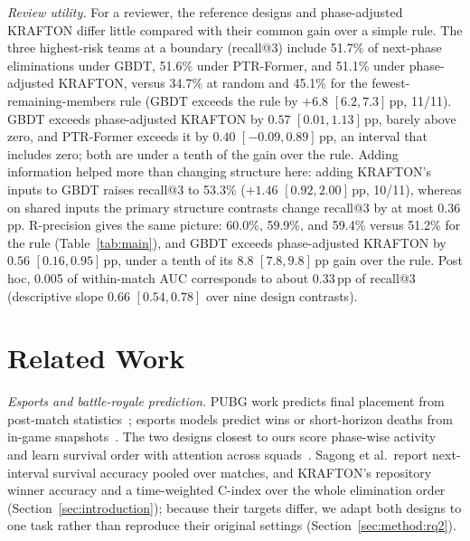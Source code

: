 \documentclass[sigconf,anonymous]{acmart}
\begin{document}
\emph{Review utility.} For a reviewer, the reference designs and phase-adjusted KRAFTON differ little compared with their common gain over a simple rule. The three highest-risk teams at a boundary (recall@3) include 51.7\% of next-phase eliminations under GBDT, 51.6\% under PTR-Former, and 51.1\% under phase-adjusted KRAFTON, versus 34.7\% at random and 45.1\% for the fewest-remaining-members rule (GBDT exceeds the rule by $+6.8$ $[6.2,\allowbreak 7.3]$\,pp, 11/11). GBDT exceeds phase-adjusted KRAFTON by $0.57$ $[0.01,\allowbreak 1.13]$\,pp, barely above zero, and PTR-Former exceeds it by $0.40$ $[-0.09,\allowbreak 0.89]$\,pp, an interval that includes zero; both are under a tenth of the gain over the rule. Adding information helped more than changing structure here: adding KRAFTON's inputs to GBDT raises recall@3 to 53.3\% ($+1.46$ $[0.92,\allowbreak 2.00]$\,pp, 10/11), whereas on shared inputs the primary structure contrasts change recall@3 by at most 0.36\,pp. R-precision gives the same picture: 60.0\%, 59.9\%, and 59.4\% versus 51.2\% for the rule (Table~\ref{tab:main}), and GBDT exceeds phase-adjusted KRAFTON by $0.56$ $[0.16,\allowbreak 0.95]$\,pp, under a tenth of its $8.8$ $[7.8,\allowbreak 9.8]$\,pp gain over the rule. Post hoc, 0.005 of within-match AUC corresponds to about 0.33\,pp of recall@3 (descriptive slope 0.66 $[0.54,\allowbreak 0.78]$ over nine design contrasts).

\section{Related Work}
\label{sec:related}
\emph{Esports and battle-royale prediction.} PUBG work predicts final placement from post-match statistics~\cite{KagglePUBG,LeeLee25}; esports models predict wins or short-horizon deaths from in-game snapshots~\cite{Hodge21,Katona19,Marshall22}. The two designs closest to ours score phase-wise activity~\cite{Sagong25a} and learn survival order with attention across squads~\cite{KRAFTON}. Sagong et al.\ report next-interval survival accuracy pooled over matches, and KRAFTON's repository winner accuracy and a time-weighted C-index over the whole elimination order (Section~\ref{sec:introduction}); because their targets differ, we adapt both designs to one task rather than reproduce their original settings (Section~\ref{sec:method:rq2}).
\end{document}
